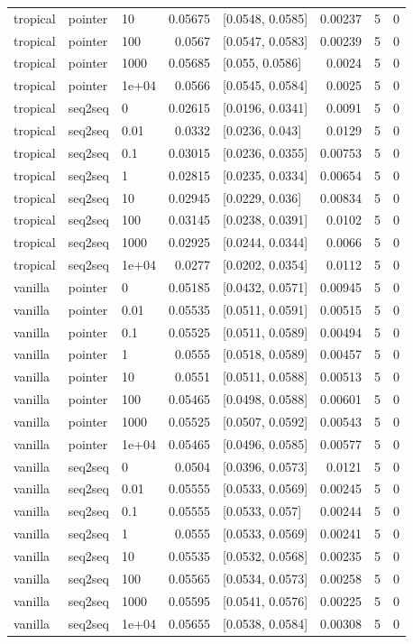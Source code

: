 \documentclass[10pt]{article}
\begin{document}
{\begin{longtable}{lllrlrrr}
tropical & pointer & 10 & 0.05675 & [0.0548, 0.0585] & 0.00237 & 5 & 0\\
tropical & pointer & 100 & 0.0567 & [0.0547, 0.0583] & 0.00239 & 5 & 0\\
tropical & pointer & 1000 & 0.05685 & [0.055, 0.0586] & 0.0024 & 5 & 0\\
tropical & pointer & 1e+04 & 0.0566 & [0.0545, 0.0584] & 0.0025 & 5 & 0\\
tropical & seq2seq & 0 & 0.02615 & [0.0196, 0.0341] & 0.0091 & 5 & 0\\
tropical & seq2seq & 0.01 & 0.0332 & [0.0236, 0.043] & 0.0129 & 5 & 0\\
tropical & seq2seq & 0.1 & 0.03015 & [0.0236, 0.0355] & 0.00753 & 5 & 0\\
tropical & seq2seq & 1 & 0.02815 & [0.0235, 0.0334] & 0.00654 & 5 & 0\\
tropical & seq2seq & 10 & 0.02945 & [0.0229, 0.036] & 0.00834 & 5 & 0\\
tropical & seq2seq & 100 & 0.03145 & [0.0238, 0.0391] & 0.0102 & 5 & 0\\
tropical & seq2seq & 1000 & 0.02925 & [0.0244, 0.0344] & 0.0066 & 5 & 0\\
tropical & seq2seq & 1e+04 & 0.0277 & [0.0202, 0.0354] & 0.0112 & 5 & 0\\
vanilla & pointer & 0 & 0.05185 & [0.0432, 0.0571] & 0.00945 & 5 & 0\\
vanilla & pointer & 0.01 & 0.05535 & [0.0511, 0.0591] & 0.00515 & 5 & 0\\
vanilla & pointer & 0.1 & 0.05525 & [0.0511, 0.0589] & 0.00494 & 5 & 0\\
vanilla & pointer & 1 & 0.0555 & [0.0518, 0.0589] & 0.00457 & 5 & 0\\
vanilla & pointer & 10 & 0.0551 & [0.0511, 0.0588] & 0.00513 & 5 & 0\\
vanilla & pointer & 100 & 0.05465 & [0.0498, 0.0588] & 0.00601 & 5 & 0\\
vanilla & pointer & 1000 & 0.05525 & [0.0507, 0.0592] & 0.00543 & 5 & 0\\
vanilla & pointer & 1e+04 & 0.05465 & [0.0496, 0.0585] & 0.00577 & 5 & 0\\
vanilla & seq2seq & 0 & 0.0504 & [0.0396, 0.0573] & 0.0121 & 5 & 0\\
vanilla & seq2seq & 0.01 & 0.05555 & [0.0533, 0.0569] & 0.00245 & 5 & 0\\
vanilla & seq2seq & 0.1 & 0.05555 & [0.0533, 0.057] & 0.00244 & 5 & 0\\
vanilla & seq2seq & 1 & 0.0555 & [0.0533, 0.0569] & 0.00241 & 5 & 0\\
vanilla & seq2seq & 10 & 0.05535 & [0.0532, 0.0568] & 0.00235 & 5 & 0\\
vanilla & seq2seq & 100 & 0.05565 & [0.0534, 0.0573] & 0.00258 & 5 & 0\\
vanilla & seq2seq & 1000 & 0.05595 & [0.0541, 0.0576] & 0.00225 & 5 & 0\\
vanilla & seq2seq & 1e+04 & 0.05655 & [0.0538, 0.0584] & 0.00308 & 5 & 0\\
\bottomrule
\end{longtable}
}
\end{document}
